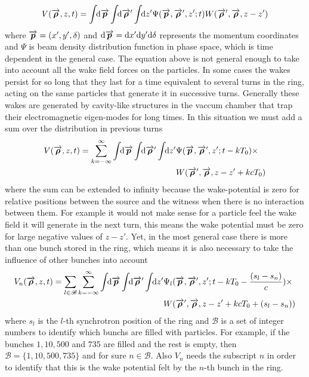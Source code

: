     \begin{align}
  	  	V(\overrightarrow{\boldsymbol{\rho}}, z, t) = \int\!\!\text{d}\overrightarrow{\boldsymbol{p}} \int\!\!\text{d}\overrightarrow{\boldsymbol{\rho}}' \int\!\!\text{d}z' 
	  			\Psi(\overrightarrow{\boldsymbol{p}},\overrightarrow{\boldsymbol{\rho}}',z'; t) W(\overrightarrow{\boldsymbol{\rho}}',\overrightarrow{\boldsymbol{\rho}},z-z')
    \end{align}
    where $\overrightarrow{\boldsymbol{p}} = (x', y', \delta)$ and $\text{d}\overrightarrow{\boldsymbol{p}} = \text{d}x'\text{d}y'\text{d}\delta$ represents the momentum coordinates and $\Psi$ is beam density distribution function in phase space, which is time dependent in the general case.  The equation above is not general enough to take into account all the wake field forces on the particles. In some cases the wakes persist for so long that they last for a time equivalent to several turns in the ring, acting on the same particles that generate it in successive turns. Generally these wakes are generated by cavity-like structures in the vaccum chamber that trap their electromagnetic eigen-modes for long times. In this situation we must add a sum over the distribution in previous turns
    \begin{align}\nonumber
  	  	V(\overrightarrow{\boldsymbol{\rho}}, z, t) = \sum_{k=-\infty}^\infty\int\!\!\text{d}\overrightarrow{\boldsymbol{p}} \int\!\!\text{d}\overrightarrow{\boldsymbol{\rho}}' \int\!\!\text{d}z' 
	  			&\Psi(\overrightarrow{\boldsymbol{p}},\overrightarrow{\boldsymbol{\rho}}',z'; t-kT_0)\times\\ &W(\overrightarrow{\boldsymbol{\rho}}',\overrightarrow{\boldsymbol{\rho}},z-z' + kcT_0)
    \end{align}
    where the sum can be extended to infinity because the wake-potential is zero for relative positions between the source and the witness when there is no interaction between them. For example it would not make sense for a particle feel the wake field it will generate in the next turn, this means the wake potential must be zero for large negative values of $z-z'$. Yet, in the most general case there is more than one bunch stored in the ring, which means it is also necessary to take the influence of other bunches into account
    \begin{align}\label{eq:general_eff_wake_pot}\nonumber
  	  	V_n(\overrightarrow{\boldsymbol{\rho}}, z, t) = \sum_{l\in\mathscr{B}}\sum_{k=-\infty}^\infty\int\!\!\text{d}\overrightarrow{\boldsymbol{p}} \int\!\!\text{d}\overrightarrow{\boldsymbol{\rho}}' \int\!\!\text{d}z' 
	  			&\Psi_l(\overrightarrow{\boldsymbol{p}},\overrightarrow{\boldsymbol{\rho}}',z'; t-kT_0-\frac{(s_l-s_n)}{c})
				\times\\
				&W(\overrightarrow{\boldsymbol{\rho}}',\overrightarrow{\boldsymbol{\rho}},z-z' + kcT_0 + (s_l-s_n))
    \end{align}
    where $s_l$ is the $l$-th synchrotron position of the ring and $\mathscr{B}$ is a set of integer numbers to identify which bunchs are filled with particles. For example, if the bunches $1, 10, 500$ and $735$ are filled and the rest is empty, then $\mathscr{B} = \{ 1, 10, 500, 735 \}$ and for sure $n\in\mathscr{B}$. Also $V_n$ needs the subscript $n$ in order to identify that this is the wake potential felt by the $n$-th bunch in the ring.

